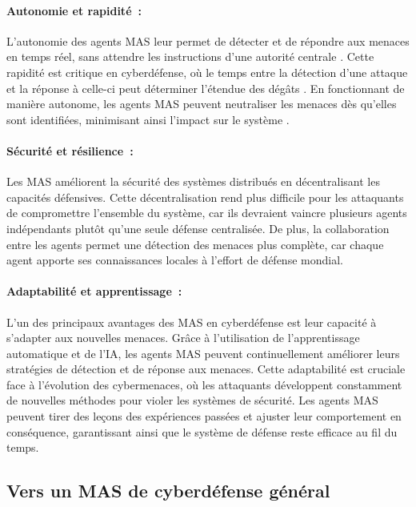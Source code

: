 \paragraph{Autonomie et rapidité :}
L'autonomie des agents MAS leur permet de détecter et de répondre aux menaces en temps réel, sans attendre les instructions d'une autorité centrale \cite{shamshirband2014cooperative}. Cette rapidité est critique en cyberdéfense, où le temps entre la détection d'une attaque et la réponse à celle-ci peut déterminer l'étendue des dégâts \cite{liao2013intrusion}. En fonctionnant de manière autonome, les agents MAS peuvent neutraliser les menaces dès qu'elles sont identifiées, minimisant ainsi l'impact sur le système \cite{shamshirband2018computational}.

\paragraph{Sécurité et résilience :}
Les MAS améliorent la sécurité des systèmes distribués en décentralisant les capacités défensives. Cette décentralisation rend plus difficile pour les attaquants de compromettre l'ensemble du système, car ils devraient vaincre plusieurs agents indépendants plutôt qu'une seule défense centralisée. De plus, la collaboration entre les agents permet une détection des menaces plus complète, car chaque agent apporte ses connaissances locales à l'effort de défense mondial.

\paragraph{Adaptabilité et apprentissage :}
L'un des principaux avantages des MAS en cyberdéfense est leur capacité à s'adapter aux nouvelles menaces. Grâce à l'utilisation de l'apprentissage automatique et de l'IA, les agents MAS peuvent continuellement améliorer leurs stratégies de détection et de réponse aux menaces. Cette adaptabilité est cruciale face à l'évolution des cybermenaces, où les attaquants développent constamment de nouvelles méthodes pour violer les systèmes de sécurité. Les agents MAS peuvent tirer des leçons des expériences passées et ajuster leur comportement en conséquence, garantissant ainsi que le système de défense reste efficace au fil du temps.

\subsection{Vers un MAS de cyberdéfense général}

